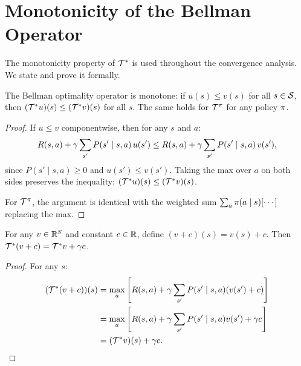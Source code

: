 \documentclass[11pt,a4paper]{article}
\begin{document}

\section{Monotonicity of the Bellman Operator}
\label{sec:monotonicity}

The monotonicity property of $\mathcal{T}^*$ is used throughout the
convergence analysis. We state and prove it formally.

\begin{proposition}
\label{prop:monotonicity}
The Bellman optimality operator is monotone: if
$u(s) \leq v(s)$ for all $s \in \mathcal{S}$, then
$(\mathcal{T}^* u)(s) \leq (\mathcal{T}^* v)(s)$ for all $s$.
The same holds for $\mathcal{T}^\pi$ for any policy $\pi$.
\end{proposition}

\begin{proof}
If $u \leq v$ componentwise, then for any $s$ and $a$:
\[
    R(s,a) + \gamma \sum_{s'} P(s' \mid s,a)\, u(s')
    \leq R(s,a) + \gamma \sum_{s'} P(s' \mid s,a)\, v(s'),
\]
since $P(s' \mid s,a) \geq 0$ and $u(s') \leq v(s')$. Taking the
max over $a$ on both sides preserves the inequality:
$(\mathcal{T}^* u)(s) \leq (\mathcal{T}^* v)(s)$.

For $\mathcal{T}^\pi$, the argument is identical with the
weighted sum $\sum_a \pi(a \mid s)[\cdots]$ replacing the max.
\end{proof}

\begin{proposition}
\label{prop:shift}
For any $v \in \mathbb{R}^S$ and constant $c \in \mathbb{R}$, define
$(v + c)(s) = v(s) + c$. Then
$\mathcal{T}^*(v + c) = \mathcal{T}^* v + \gamma c$.
\end{proposition}

\begin{proof}
For any $s$:
\begin{align*}
    (\mathcal{T}^*(v+c))(s)
    &= \max_a \left[R(s,a) + \gamma \sum_{s'} P(s' \mid s,a)
    (v(s') + c)\right] \\
    &= \max_a \left[R(s,a) + \gamma \sum_{s'} P(s' \mid s,a)
    v(s') + \gamma c\right] \\
    &= (\mathcal{T}^* v)(s) + \gamma c. \qedhere
\end{align*}
\end{proof}
\end{document}
